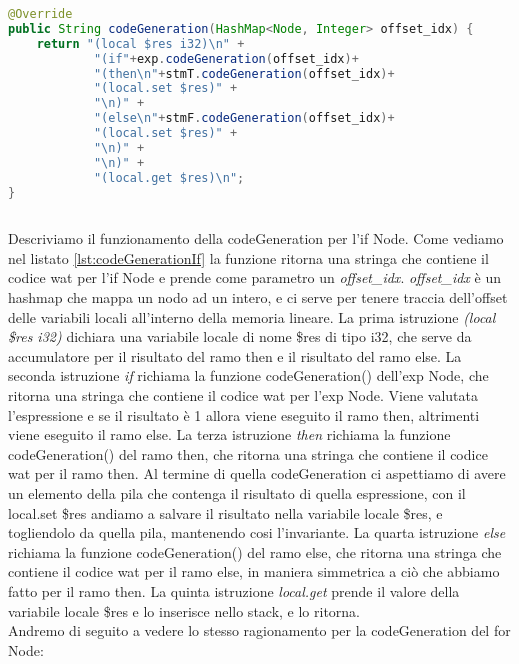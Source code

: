 \documentclass[../../main.tex]{subfiles}
\begin{document}
\begin{lstlisting}[language=Java, caption={codeGeneration() per l'if Node}, label={lst:codeGenerationIf}]
@Override
public String codeGeneration(HashMap<Node, Integer> offset_idx) {
    return "(local $res i32)\n" +
            "(if"+exp.codeGeneration(offset_idx)+
            "(then\n"+stmT.codeGeneration(offset_idx)+
            "(local.set $res)" +
            "\n)" +
            "(else\n"+stmF.codeGeneration(offset_idx)+
            "(local.set $res)" +
            "\n)" +
            "\n)" +
            "(local.get $res)\n";
}
    
\end{lstlisting}
Descriviamo il funzionamento della codeGeneration per l'if Node. Come vediamo nel listato \ref{lst:codeGenerationIf} la funzione ritorna una stringa che contiene il codice wat per l'if Node e prende come parametro un \textit{offset\_idx}.
\textit{offset\_idx} è un hashmap che mappa un nodo ad un intero, e ci serve per tenere traccia dell'offset delle variabili locali all'interno della memoria lineare.
La prima istruzione \textit{(local \$res i32)} dichiara una variabile locale di nome \$res di tipo i32, che serve da accumulatore per il risultato del ramo then e il risultato del ramo else.
La seconda istruzione \textit{if} richiama la funzione codeGeneration() dell'exp Node, che ritorna una stringa che contiene il codice wat per l'exp Node.
Viene valutata l'espressione e se il risultato è 1 allora viene eseguito il ramo then, altrimenti viene eseguito il ramo else.
La terza istruzione \textit{then} richiama la funzione codeGeneration() del ramo then, che ritorna una stringa che contiene il codice wat per il ramo then.
Al termine di quella codeGeneration ci aspettiamo di avere un elemento della pila che contenga il risultato di quella espressione, con il local.set \$res andiamo a salvare il risultato nella variabile locale \$res, e togliendolo da quella pila, mantenendo cosi l'invariante.
La quarta istruzione \textit{else} richiama la funzione codeGeneration() del ramo else, che ritorna una stringa che contiene il codice wat per il ramo else, in maniera simmetrica a ciò che abbiamo fatto per il ramo then.
La quinta istruzione \textit{local.get} prende il valore della variabile locale \$res e lo inserisce nello stack, e lo ritorna.\\
Andremo di seguito a vedere lo stesso ragionamento per la codeGeneration del for Node:
    
\end{document}
